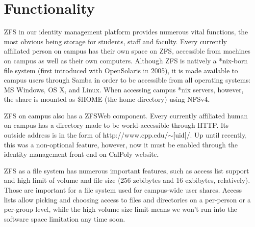\section{Functionality}
ZFS in our identity management platform provides numerous vital functions, the most obvious being storage for students, staff and faculty. Every currently affiliated person on campus has their own space on ZFS, accessible from machines on campus as well as their own computers. Although ZFS is natively a *nix-born file system (first introduced with OpenSolaris in 2005), it is made available to campus users through Samba in order to be accessible from all operating systems: MS Windows, OS X, and Linux. When accessing campus *nix servers, however, the share is mounted as \$HOME (the home directory) using NFSv4. 

ZFS on campus also has a ZFSWeb component. Every currently affiliated human on campus has a directory made to be world-accessible through HTTP. Its outside address is in the form of http://www.cpp.edu/$\sim$[uid]/. Up until recently, this was a non-optional feature, however, now it must be enabled through the identity management front-end on CalPoly website.

ZFS as a file system has numerous important features, such as access list support and high limit of volume and file size (256 zebibytes and 16 exbibytes, relatively). Those are important for a file system used for campus-wide user shares. Access lists allow picking and choosing access to files and directories on a per-person or a per-group level, while the high volume size limit means we won't run into the software space limitation any time soon. 
